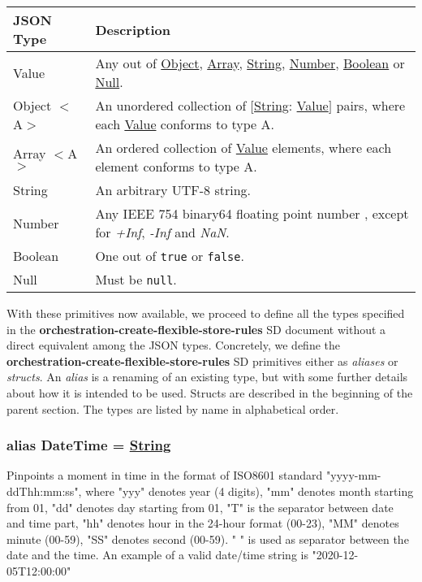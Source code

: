 \documentclass[a4paper]{arrowhead}
\newcommand{\pdef}[1]{{\textcolor{ArrowheadGrey}{#1 \label{sec:model:primitives:#1} \label{sec:model:primitives:#1s}}}}
\newcommand{\pref}[1]{{\textcolor{ArrowheadGrey}{\hyperref[sec:model:primitives:#1]{#1}}}}
\begin{document}
\begin{table}[ht!]
\begin{tabularx}{\textwidth}{| p{3cm} | X |} \hline
\rowcolor{gray!33} JSON Type & Description \\ \hline
\pdef{Value}                 & Any out of \pref{Object}, \pref{Array}, \pref{String}, \pref{Number}, \pref{Boolean} or \pref{Null}. \\ \hline
\pdef{Object}$<$A$>$         & An unordered collection of $[$\pref{String}: \pref{Value}$]$ pairs, where each \pref{Value} conforms to type A. \\ \hline
\pdef{Array}$<$A$>$          & An ordered collection of \pref{Value} elements, where each element conforms to type A. \\ \hline
\pdef{String}                & An arbitrary UTF-8 string. \\ \hline
\pdef{Number}                & Any IEEE 754 binary64 floating point number \cite{cowlishaw2019floating}, except for \textit{+Inf}, \textit{-Inf} and \textit{NaN}. \\ \hline
\pdef{Boolean}               & One out of \texttt{true} or \texttt{false}. \\ \hline
\pdef{Null}                  & Must be \texttt{null}. \\ \hline
\end{tabularx}
\end{table}

With these primitives now available, we proceed to define all the types specified in the \textbf{orchestration-create-flexible-store-rules} SD document without a direct equivalent among the JSON types.
Concretely, we define the \textbf{orchestration-create-flexible-store-rules} SD primitives either as \textit{aliases} or \textit{structs}.
An \textit{alias} is a renaming of an existing type, but with some further details about how it is intended to be used.
Structs are described in the beginning of the parent section.
The types are listed by name in alphabetical order.

\subsubsection{alias \pdef{DateTime} = \pref{String}}

Pinpoints a moment in time in the format of ISO8601 standard "yyyy-mm-ddThh:mm:ss", where "yyy" denotes year (4 digits), "mm" denotes month starting from 01, "dd" denotes day starting from 01, "T" is the separator between date and time part, "hh" denotes hour in the 24-hour format (00-23), "MM" denotes minute (00-59), "SS" denotes second (00-59). " " is used as separator between the date and the time.
An example of a valid date/time string is "2020-12-05T12:00:00"
\end{document}
